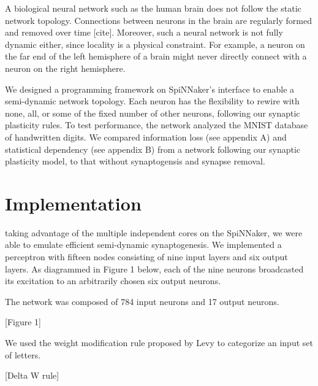 \documentclass[journal]{./sty/IEEEtran}
\begin{document}
A biological neural network such as the human brain does not follow the static network topology. 
Connections between neurons in the brain are regularly formed and removed over time [cite]. 
Moreover, such a neural network is not fully dynamic either, since locality is a physical constraint. 
For example, a neuron on the far end of the left hemisphere of a brain might never directly connect with a neuron on the right hemisphere.

We designed a programming framework on SpiNNaker's interface to enable a semi-dynamic network topology.
Each neuron has the flexibility to rewire with none, all, or some of the fixed number of other neurons, following our synaptic plasticity rules.
To test performance, the network analyzed the MNIST database of handwritten digits. We compared information loss (see appendix A) and statistical dependency (see appendix B) from a network following our synaptic plasticity model, to that without synaptogensis and synapse removal.



\section{Implementation}
 taking advantage of the multiple independent cores on the SpiNNaker, we were able to emulate efficient semi-dynamic synaptogenesis. We implemented a perceptron with fifteen nodes consisting of nine input layers and six output layers. As diagrammed in Figure 1 below, each of the nine neurons broadcasted its excitation to an arbitrarily chosen six output neurons. 

The network was composed of 784 input neurons and 17 output neurons.

\vspace{0.5cm}
[Figure 1]
\vspace{0.5cm}

We used the weight modification rule proposed by Levy to categorize an input set of letters. 

\vspace{0.5cm}
[Delta W rule]
\vspace{0.5cm}
\end{document}

